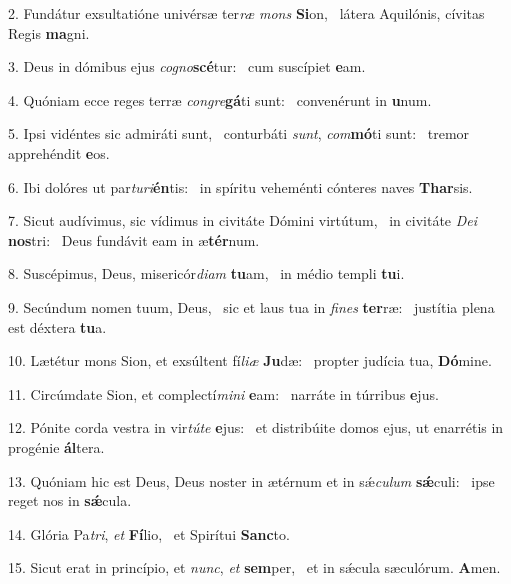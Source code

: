 2. Fundátur exsultatióne univérsæ ter\textit{ræ} \textit{mons} \textbf{Si}on, \ast\  látera Aquilónis, cívitas Regis \textbf{ma}gni.\

3. Deus in dómibus ejus \textit{co}\textit{gno}\textbf{scé}tur: \ast\  cum suscípiet \textbf{e}am.\

4. Quóniam ecce reges terræ \textit{con}\textit{gre}\textbf{gá}ti sunt: \ast\  convenérunt in \textbf{u}num.\

5. Ipsi vidéntes sic admiráti sunt, \dag\  conturbáti \textit{sunt}, \textit{com}\textbf{mó}ti sunt: \ast\  tremor apprehéndit \textbf{e}os.\

6. Ibi dolóres ut par\textit{tu}\textit{ri}\textbf{én}tis: \ast\  in spíritu veheménti cónteres naves \textbf{Thar}sis.\

7. Sicut audívimus, sic vídimus in civitáte Dómini virtútum, \dag\  in civitáte \textit{De}\textit{i} \textbf{nos}tri: \ast\  Deus fundávit eam in æ\textbf{tér}num.\

8. Suscépimus, Deus, misericór\textit{di}\textit{am} \textbf{tu}am, \ast\  in médio templi \textbf{tu}i.\

9. Secúndum nomen tuum, Deus, \dag\  sic et laus tua in \textit{fi}\textit{nes} \textbf{ter}ræ: \ast\  justítia plena est déxtera \textbf{tu}a.\

10. Lætétur mons Sion, et exsúltent fí\textit{li}\textit{æ} \textbf{Ju}dæ: \ast\  propter judícia tua, \textbf{Dó}mine.\

11. Circúmdate Sion, et complectí\textit{mi}\textit{ni} \textbf{e}am: \ast\  narráte in túrribus \textbf{e}jus.\

12. Pónite corda vestra in vir\textit{tú}\textit{te} \textbf{e}jus: \ast\  et distribúite domos ejus, ut enarrétis in progénie \textbf{ál}tera.\

13. Quóniam hic est Deus, Deus noster in ætérnum et in sǽ\textit{cu}\textit{lum} \textbf{sǽ}culi: \ast\  ipse reget nos in \textbf{sǽ}cula.\

14. Glória Pa\textit{tri}, \textit{et} \textbf{Fí}lio, \ast\  et Spirítui \textbf{Sanc}to.\

15. Sicut erat in princípio, et \textit{nunc}, \textit{et} \textbf{sem}per, \ast\  et in sǽcula sæculórum. \textbf{A}men.\

